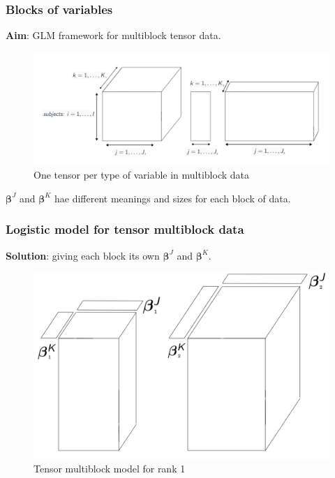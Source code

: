 \documentclass{beamer}
\begin{document}
\begin{frame}
 \frametitle{Blocks of variables}
 \textbf{Aim}: GLM framework for multiblock tensor data.\\[10 pt]

 \begin{figure}
    \centering
    \includegraphics[scale = 0.3]{images/blocks_faux.png}
    \caption{One tensor per type of variable in multiblock data}
\end{figure}

$\bm{\beta}^J$ and $\bm{\beta}^K$ hae different meanings and sizes for each block of data.

\end{frame}


\begin{frame}
    \frametitle{Logistic model for tensor multiblock data}
    \vspace{10 pt}
    \textbf{Solution}: giving each block its own $\bm{\beta}^J$ and $\bm{\beta}^K$.\\[15 pt]
    \begin{figure}
        \centering
        \includegraphics[scale = 0.28]{images/beta_blocks.png}
        \caption{Tensor multiblock model for rank 1}
    \end{figure}
\end{frame}
\end{document}
